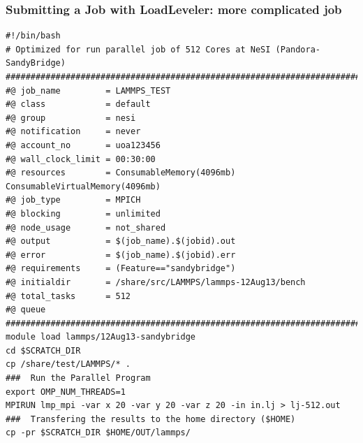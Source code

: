 \documentclass{beamer}
\begin{document}
\begin{frame}
  \frametitle{Submitting a Job with LoadLeveler: more complicated job}
\begin{verbatim}
#!/bin/bash
# Optimized for run parallel job of 512 Cores at NeSI (Pandora-SandyBridge)
##########################################################################
#@ job_name         = LAMMPS_TEST
#@ class            = default
#@ group            = nesi
#@ notification     = never
#@ account_no       = uoa123456
#@ wall_clock_limit = 00:30:00
#@ resources        = ConsumableMemory(4096mb) ConsumableVirtualMemory(4096mb)
#@ job_type         = MPICH
#@ blocking         = unlimited
#@ node_usage       = not_shared
#@ output           = $(job_name).$(jobid).out
#@ error            = $(job_name).$(jobid).err
#@ requirements     = (Feature=="sandybridge")
#@ initialdir       = /share/src/LAMMPS/lammps-12Aug13/bench
#@ total_tasks      = 512
#@ queue
##########################################################################
module load lammps/12Aug13-sandybridge
cd $SCRATCH_DIR
cp /share/test/LAMMPS/* .
###  Run the Parallel Program
export OMP_NUM_THREADS=1
MPIRUN lmp_mpi -var x 20 -var y 20 -var z 20 -in in.lj > lj-512.out
###  Transfering the results to the home directory ($HOME)
cp -pr $SCRATCH_DIR $HOME/OUT/lammps/
\end{verbatim}
\end{frame}



\end{document}
